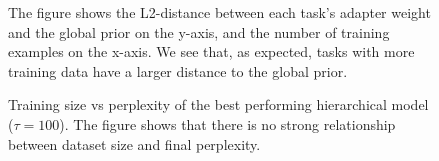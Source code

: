 \documentclass[fullpaper]{nldl}
\begin{document}
\begin{figure}[ht]
    \centering
    \caption{The figure shows the L2-distance between each task's adapter weight and the global prior on the y-axis, and the number of training examples on the x-axis. We see that, as expected, tasks with more training data  have a larger distance to the global prior.}
    \label{fig:weights_vs_datalen} 
\end{figure}

\begin{figure}
    \centering
    \caption{Training size vs perplexity of the best performing hierarchical model ($\tau = 100$). The figure shows that there is no strong relationship between dataset size and final perplexity.}
    \label{fig:absolute_improvement}
\end{figure}
\end{document}
